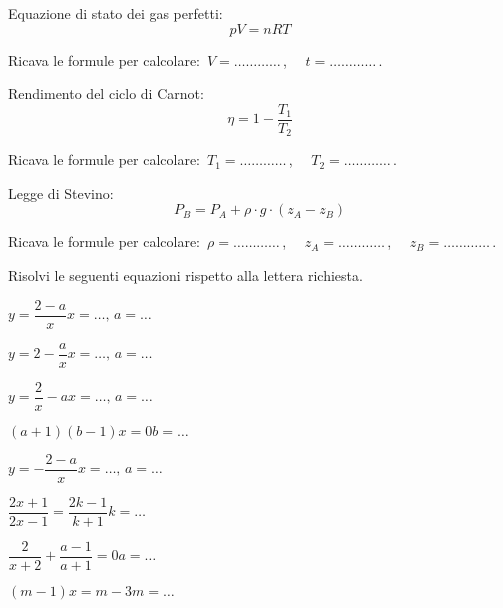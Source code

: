 \begin{esercizio}
\label{ese:20.65}
Equazione di stato dei gas perfetti:
\begin{equation*}
  pV=nRT
\end{equation*}

Ricava le formule per calcolare:~$V=\ldots\ldots\ldots\ldots$\,, $\quad 
t=\ldots\ldots\ldots\ldots$\,.
\end{esercizio}

\begin{esercizio}
\label{ese:20.66}
Rendimento del ciclo di Carnot:
\begin{equation*}
  \eta =1-\dfrac{T_{1}}{T_{2}}
\end{equation*}

Ricava le formule per calcolare:~$T_1=\ldots\ldots\ldots\ldots$\,, $\quad 
T_2=\ldots\ldots\ldots\ldots$\,.
\end{esercizio}

\begin{esercizio}
\label{ese:20.67}
Legge di Stevino:
\begin{equation*}
  P_{B}=P_{A}+\rho \cdot g\cdot (z_{A}-z_{B})
\end{equation*}

Ricava le formule per calcolare:~$\rho=\ldots\ldots\ldots\ldots$\,, $\quad 
z_A=\ldots\ldots\ldots\ldots$\,, $\quad z_B =\ldots\ldots\ldots\ldots$\,.
\end{esercizio}

\newpage %

\begin{esercizio}
\label{ese:20.68}
Risolvi le seguenti equazioni rispetto alla lettera richiesta.
\begin{multicols}{2}
\TabPositions{2.5cm}
\begin{enumeratea}
 \item $y=\dfrac{2-a}{x}$\hfill$x=\ldots,\,a=\ldots$
 \item $y=2-\dfrac{a}{x}$\hfill$x=\ldots,\,a=\ldots$
 \item $y=\dfrac{2}{x}-a$\hfill$x=\ldots,\,a=\ldots$
 \item $(a+1)(b-1)x=0$\hfill$b=\ldots$
 \item $y=-{\dfrac{2-a}{x}}$\hfill$x=\ldots,\,a=\ldots$
 \item $\dfrac{2x+1}{2x-1}=\dfrac{2k-1}{k+1}$\hfill$k=\ldots$
 \item $\dfrac{2}{x+2}+\dfrac{a-1}{a+1}=0$\hfill$a=\ldots$
 \item $(m-1)x=m-3$\hfill$m=\ldots$
\end{enumeratea}
\end{multicols}
\end{esercizio}

